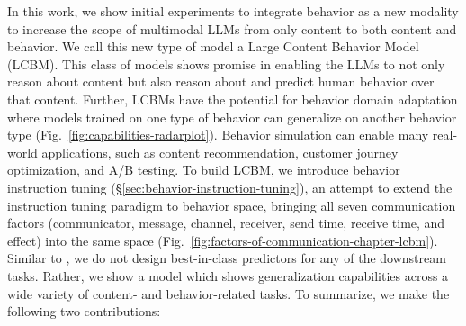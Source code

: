 In this work, we show initial experiments to integrate behavior as a new modality to increase the scope of multimodal LLMs from only content to both content and behavior. We call this new type of model a Large Content Behavior Model (LCBM). This class of models shows promise in enabling the LLMs to not only reason about content but also reason about and predict human behavior over that content. Further, LCBMs have the potential for behavior domain adaptation where models trained on one type of behavior can generalize on another behavior type (Fig.~\ref{fig:capabilities-radarplot}). Behavior simulation can enable many real-world applications, such as content recommendation, customer journey optimization, and A/B testing. To build LCBM, we introduce behavior instruction tuning (\S\ref{sec:behavior-instruction-tuning}), an attempt to extend the instruction tuning paradigm to behavior space, bringing all seven communication factors (communicator, message, channel, receiver, send time, receive time, and effect) into the same space (Fig.~\ref{fig:factors-of-communication-chapter-lcbm}). Similar to \cite{brown2020language,raffel2020exploring,liu2023visual,ge2023planting}, we do not design best-in-class predictors for any of the downstream tasks. Rather, we show a model which shows generalization capabilities across a wide variety of content- and behavior-related tasks. To summarize, we make the following two contributions:

